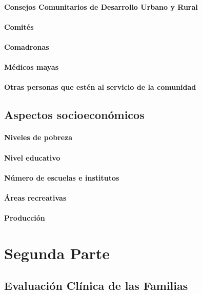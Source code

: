 \documentclass{article}
\begin{document}
\paragraph{Consejos Comunitarios de Desarrollo Urbano y Rural}
\paragraph{Comités}
\paragraph{Comadronas}
\paragraph{Médicos mayas}
\paragraph{Otras personas que estén al servicio de la comunidad}

\subsection{Aspectos socioeconómicos}
\paragraph{Niveles de pobreza}
\paragraph{Nivel educativo}
\paragraph{Número de escuelas e institutos}
\paragraph{Áreas recreativas}
\paragraph{Producción}

\section{Segunda Parte}
\subsection{Evaluación Clínica de las Familias}
\end{document}
